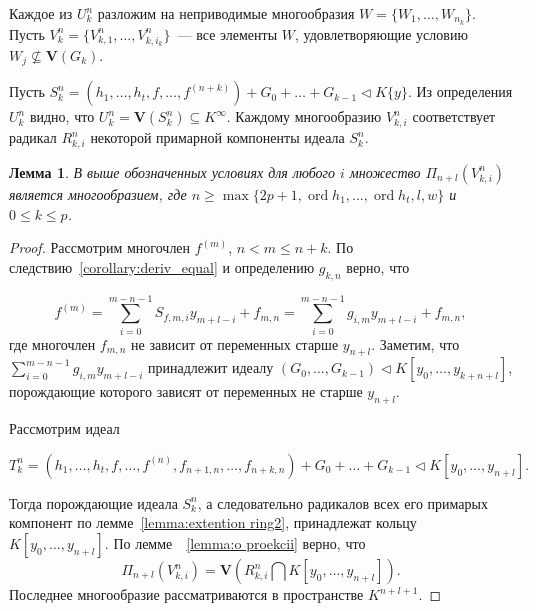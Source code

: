 \documentclass[16pt]{article}
\DeclareMathOperator{\ord}{ord}
\renewcommand{\le}{\leqslant} %
\renewcommand{\ge}{\geqslant} %
\theoremstyle{plain1}
\newtheorem{lemma}[theorem1]{Лемма}
\theoremstyle{plain2}
\theoremstyle{plain}
\theoremstyle{plain3}
\theoremstyle{definition}
\theoremstyle{remark}
\begin{document}
Каждое из ${U}^n_k$ разложим на неприводимые многообразия $W=\{{W}_{1},\ldots,{W}_{n_k}\}$. Пусть $V^n_k=\{{V}^n_{k,1},\ldots,{V}^n_{k,i_k}\}$~--- все элементы $W$, удовлетворяющие условию ${W}_{j}\not\subseteq\mathbf{V}(G_k)$.

Пусть  $S_k^n=\left(h_1,\ldots,h_t,f,\ldots,f^{(n+k)}\right)+G_0+\ldots+ G_{k-1}\triangleleft K\{y\}$. Из определения ${U}_k^n$ видно, что ${U}_k^n=\mathbf{V}(S_k^n)\subseteq K^{\infty}$. Каждому многообразию ${V}_{k,i}^n$ соответствует радикал $R_{k,i}^n$ некоторой примарной компоненты идеала $S_k^n$.


\begin{lemma} \label{lemma:o_ideale}
 В выше обозначенных условиях для любого $i$ множество $\Pi_{n+l}({V}_{k,i}^n)$ является многообразием, где $n \ge\max\{ 2p+1,\ord{h_1},\ldots,\ord{h_t},l,w\}$ и  $0\le k\le p$.
\end{lemma}

\begin{proof}
Рассмотрим многочлен $f^{(m)}$, $n<m\le n+k$. По следствию~\ref{corollary:deriv_equal} и определению $g_{k,n}$ верно, что

$$
f^{(m)}= \sum\limits_{i=0}^{m-n-1} S_{f,m,i}y_{m+l -i} + f_{m,n}=\sum\limits_{i=0}^{m-n-1} g_{i,m}y_{m+l -i} + f_{m,n},
$$
где многочлен $f_{m,n}$ не зависит от переменных старше $y_{n+l}$. Заметим, что $\sum\limits_{i=0}^{m-n-1} g_{i,m}y_{m+l -i}$ принадлежит идеалу  $(G_0,\ldots, G_{k-1})\triangleleft K[y_0,\ldots,y_{k+n+l}]$,  порождающие которого зависят от переменных не старше $y_{n+l}$.

Рассмотрим идеал

$$
T_k^n=(h_1,\ldots,h_t,f,\ldots,f^{(n)},f_{n+1,n},\ldots,f_{n+k,n}) + G_0+\ldots+ G_{k-1}\triangleleft K[y_0,\ldots,y_{n+l}].
$$

Тогда порождающие идеала $S_k^n$, а следовательно радикалов всех его примарых компонент по лемме~\ref{lemma:extention ring2}, принадлежат кольцу $K[y_0,\ldots,y_{n+l}]$. По лемме~~\ref{lemma:o proekcii} верно, что
$$
\Pi_{n+l}({V}_{k,i}^n)=\mathbf{V}(R_{k,i}^n\bigcap K[y_0,\ldots,y_{n+l}]).
$$
Последнее многообразие рассматриваются в пространстве $K^{n+l+1}$.
\end{proof}
\end{document}
